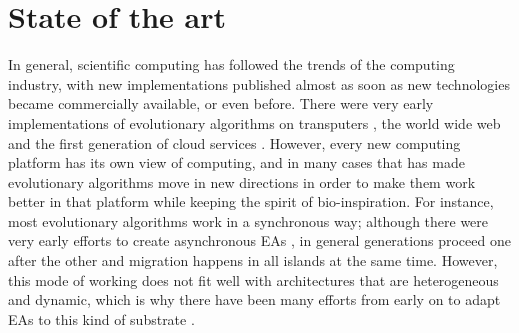 \documentclass{llncs}
\begin{document}
  \section{State of the art}
  In general, scientific computing has followed the trends of the
  computing industry, with new implementations published almost as soon
  as new technologies became commercially available, or even
  before. There were very early implementations of evolutionary
  algorithms on transputers \cite{voigt1990modelling}, the world wide
  web \cite{chong:1999:jDGPi} and the first generation of cloud
  services
  \cite{DBLP:journals/corr/abs-1105-6205,de2017parallel,salza2017ccube}. %
  However, every new computing platform has its own view of computing, and in many cases that has made evolutionary algorithms move in new directions in order to make them work better in that platform while keeping the spirit of
  bio-inspiration. For instance, most evolutionary algorithms work in a
  synchronous way; although there were very early efforts to create
  asynchronous EAs \cite{coleman89}, in general
  generations proceed one after the other and migration happens in
  all islands at the same time. However, this mode of working does not
  fit well with architectures that are heterogeneous and dynamic, which
  is why there have been many efforts from early
  on to adapt EAs to this kind of substrate
  \cite{Jini:FEA2000,zorman2002creation,baugh2003asynchronous}.
\end{document}
